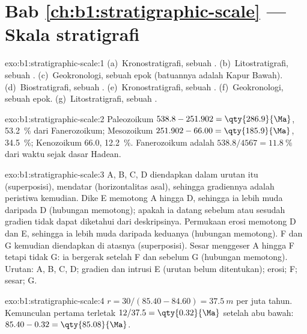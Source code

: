 \section*{Bab \ref{ch:b1:stratigraphic-scale} --- Skala stratigrafi}

\begin{solution}{exo:b1:stratigraphic-scale:1}
(a)~Kronostratigrafi, sebuah . (b)~Litostratigrafi, sebuah .
(c)~Geokronologi, sebuah epok (batuannya adalah  Kapur Bawah).
(d)~Biostratigrafi, sebuah . (e)~Kronostratigrafi, sebuah .
(f)~Geokronologi, sebuah epok. (g)~Litostratigrafi, sebuah .
\end{solution}

\begin{solution}{exo:b1:stratigraphic-scale:2}
Paleozoikum $538.8 - 251.902 = \qty{286.9}{\Ma}$, \qty{53.2}{\%} dari
Fanerozoikum; Mesozoikum $251.902 - 66.00 = \qty{185.9}{\Ma}$, \qty{34.5}{\%};
Kenozoikum \qty{66.0}{\Ma}, \qty{12.2}{\%}. Fanerozoikum adalah
$538.8/4567 = \qty{11.8}{\%}$ dari waktu sejak dasar Hadean.
\end{solution}

\begin{solution}{exo:b1:stratigraphic-scale:3}
A, B, C, D diendapkan dalam urutan itu (superposisi), mendatar (horizontalitas asal),
sehingga gradiennya adalah peristiwa kemudian. Dike E memotong A hingga D, sehingga
ia lebih muda daripada D (hubungan memotong); apakah ia datang sebelum atau sesudah
gradien tidak dapat diketahui dari deskripsinya. Permukaan erosi memotong D dan E,
sehingga ia lebih muda daripada keduanya (hubungan memotong). F dan G kemudian
diendapkan di atasnya (superposisi). Sesar menggeser A hingga F tetapi tidak G: ia
bergerak setelah F dan sebelum G (hubungan memotong). Urutan: A, B, C, D; gradien
dan intrusi E (urutan belum ditentukan); erosi; F; sesar; G.
\end{solution}

\begin{solution}{exo:b1:stratigraphic-scale:4}
$r = 30/(85.40 - 84.60) = \qty{37.5}{m}$ per juta tahun. Kemunculan pertama terletak
$12/37.5 = \qty{0.32}{\Ma}$ setelah abu bawah: $85.40 - 0.32 =
\qty{85.08}{\Ma}$.
\end{solution}

